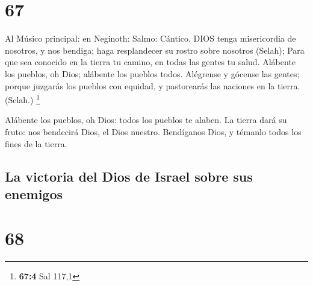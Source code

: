 \hypertarget{section-66}{%
\section{67}\label{section-66}}

 Al Músico principal: en Neginoth: Salmo: Cántico. DIOS
tenga misericordia de nosotros, y nos bendiga; haga resplandecer su
rostro sobre nosotros (Selah);  Para que sea conocido en la
tierra tu camino, en todas las gentes tu salud.  Alábente
los pueblos, oh Dios; alábente los pueblos todos.  Alégrense
y gócense las gentes; porque juzgarás los pueblos con equidad, y
pastorearás las naciones en la tierra. (Selah.) \footnote{\textbf{67:4}
  Sal 117,1}

 Alábente los pueblos, oh Dios: todos los pueblos te alaben.
 La tierra dará su fruto: nos bendecirá Dios, el Dios
nuestro.  Bendíganos Dios, y témanlo todos los fines de la
tierra.

\hypertarget{la-victoria-del-dios-de-israel-sobre-sus-enemigos}{%
\subsection{La victoria del Dios de Israel sobre sus
enemigos}\label{la-victoria-del-dios-de-israel-sobre-sus-enemigos}}

\hypertarget{section-67}{%
\section{68}\label{section-67}}

